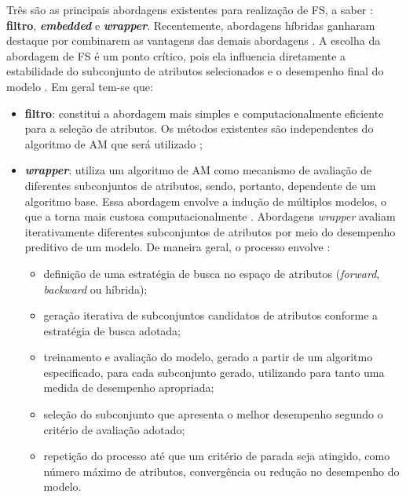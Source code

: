 Três são as principais abordagens existentes para realização de FS, a saber \cite{Theng2024,Tan2020}: \textbf{filtro}, \textbf{\textit{embedded}} e \textbf{\textit{wrapper}}. Recentemente, abordagens híbridas ganharam destaque por combinarem as vantagens das demais abordagens \cite{EBRAHIMIWARKIANI2025129372,10895909,Theng2024,10.1007/978-3-031-23092-9_12,SolorioFernandez2020}. A escolha da abordagem de FS é um ponto crítico, pois ela influencia diretamente a estabilidade do subconjunto de atributos selecionados e o desempenho final do modelo \cite{KHAIRE20221060,BARBIERI2024123667}. Em geral tem-se que:
\begin{itemize}
    \item \textbf{filtro}: constitui a abordagem mais simples e computacionalmente eficiente para a seleção de atributos. Os métodos existentes são independentes do algoritmo de AM que será utilizado \cite{Theng2024,Dhal2022,EBRAHIMIWARKIANI2025129372,10.1007/978-3-031-23092-9_12};
    
    \item \textbf{\textit{wrapper}}: utiliza um algoritmo de AM como mecanismo de avaliação de diferentes subconjuntos de atributos, sendo, portanto, dependente de um algoritmo base. Essa abordagem envolve a indução de múltiplos modelos, o que a torna mais custosa computacionalmente \cite{Theng2024}. Abordagens \textit{wrapper} avaliam iterativamente diferentes subconjuntos de atributos por meio do desempenho preditivo de um modelo. De maneira geral, o processo envolve \cite{Tan2020}:
        \begin{itemize}
            \item definição de uma estratégia de busca no espaço de atributos (\textit{forward}, \textit{backward} ou híbrida);

            \item geração iterativa de subconjuntos candidatos de atributos conforme a estratégia de busca adotada;

            \item treinamento e avaliação do modelo, gerado a partir de um algoritmo especificado, para cada subconjunto gerado, utilizando para tanto uma medida de desempenho apropriada;

            \item seleção do subconjunto que apresenta o melhor desempenho segundo o critério de avaliação adotado;

            \item repetição do processo até que um critério de parada seja atingido, como número máximo de atributos, convergência ou redução no desempenho do modelo.
        \end{itemize}
    

\end{itemize}
